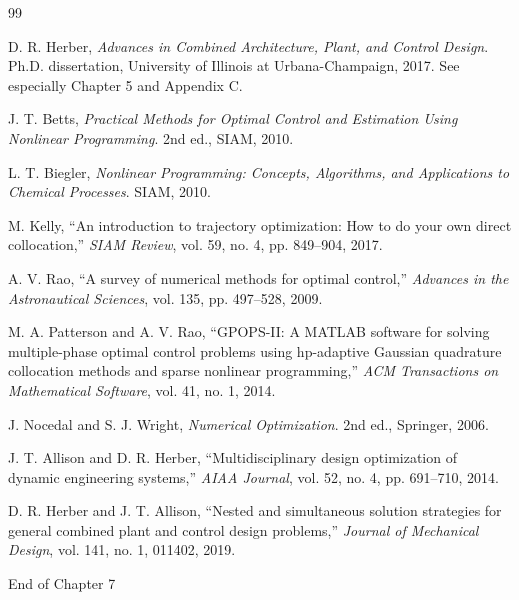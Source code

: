 \documentclass[11pt]{article}
\begin{document}
\begin{thebibliography}{99}

D. R. Herber, \emph{Advances in Combined Architecture, Plant, and Control Design}. Ph.D. dissertation, University of Illinois at Urbana-Champaign, 2017. See especially Chapter 5 and Appendix C.

J. T. Betts, \emph{Practical Methods for Optimal Control and Estimation Using Nonlinear Programming}. 2nd ed., SIAM, 2010.

L. T. Biegler, \emph{Nonlinear Programming: Concepts, Algorithms, and Applications to Chemical Processes}. SIAM, 2010.

M. Kelly, ``An introduction to trajectory optimization: How to do your own direct collocation,'' \emph{SIAM Review}, vol. 59, no. 4, pp. 849--904, 2017.

A. V. Rao, ``A survey of numerical methods for optimal control,'' \emph{Advances in the Astronautical Sciences}, vol. 135, pp. 497--528, 2009.

M. A. Patterson and A. V. Rao, ``GPOPS-II: A MATLAB software for solving multiple-phase optimal control problems using hp-adaptive Gaussian quadrature collocation methods and sparse nonlinear programming,'' \emph{ACM Transactions on Mathematical Software}, vol. 41, no. 1, 2014.

J. Nocedal and S. J. Wright, \emph{Numerical Optimization}. 2nd ed., Springer, 2006.

J. T. Allison and D. R. Herber, ``Multidisciplinary design optimization of dynamic engineering systems,'' \emph{AIAA Journal}, vol. 52, no. 4, pp. 691--710, 2014.

D. R. Herber and J. T. Allison, ``Nested and simultaneous solution strategies for general combined plant and control design problems,'' \emph{Journal of Mechanical Design}, vol. 141, no. 1, 011402, 2019.

\end{thebibliography}

\vfill
\begin{center}
\small\color{CCDgray}
End of Chapter 7
\end{center}
\end{document}
